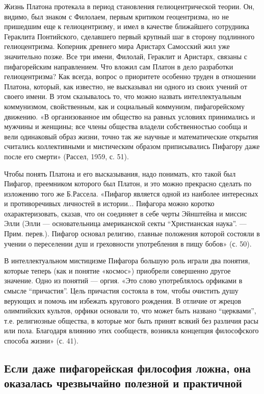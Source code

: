Жизнь Платона протекала в период становления гелиоцентрической теории.
Он, видимо, был знаком с Филолаем, первым критиком геоцентризма, но не
пришедшим еще к гелиоцентризму, и имел в качестве ближайшего
сотрудника Гераклита Понтийского, сделавшего первый крупный шаг в
сторону подлинного гелиоцентризма. Коперник древнего мира Аристарх
Самосский жил уже значительно позже. Все три имени, Филолай, Гераклит
и Аристарх, связаны с пифагорейским направлением. Что вложил сам
Платон в дело разработки гелиоцентризма? Как всегда, вопрос о
приоритете особенно труден в отношении Платона, который, как известно,
не высказывал ни одного из своих учений от своего имени. В этом
сказывалось то, что можно назвать интеллектуальным коммунизмом,
свойственным, как и социальный коммунизм, пифагорейскому движению. «В
организованное им общество на равных условиях принимались и мужчины и
женщины; все члены общества владели собственностью сообща и вели
одинаковый образ жизни, точно так же научные и математические открытия
считались коллективными и мистическим образом приписывались Пифагору
даже после его смерти» (Рассел, 1959, с. 51).

Чтобы понять Платона и его высказывания, надо понимать, кто такой был
Пифагор, преемником которого был Платон, и это можно прекрасно сделать
по изложению того же Б.Рассела. «Пифагор является одной из наиболее
интересных и противоречивых личностей в истории... Пифагора можно
коротко охарактеризовать, сказав, что он соединяет в себе черты
Эйнштейна и миссис Элли (Элли --- основательница американской секты
``Христианская наука''. --- Прим. перев.). Пифагор основал религию,
главные положения которой состояли в учении о переселении душ и
греховности употребления в пищу бобов» (с. 50).

В интеллектуальном мистицизме Пифагора большую роль играли два
понятия, которые теперь (как и понятие «космос») приобрели совершенно
другое значение. Одно из понятий --- оргия. «Это слово употреблялось
орфиками в смысле ``причастия''. Цель причастия состояла в том, чтобы
очистить душу верующих и помочь им избежать кругового рождения. В
отличие от жрецов олимпийских культов, орфики основали то, что может
быть названо ``церквами'', т.е. религиозные общества, в которые мог
быть принят всякий без различия расы или пола. Благодаря влиянию этих
сообществ, возникла концепция философского способа жизни» (с. 41).

\subsection{Если даже пифагорейская философия ложна, она оказалась
чрезвычайно полезной и практичной}

